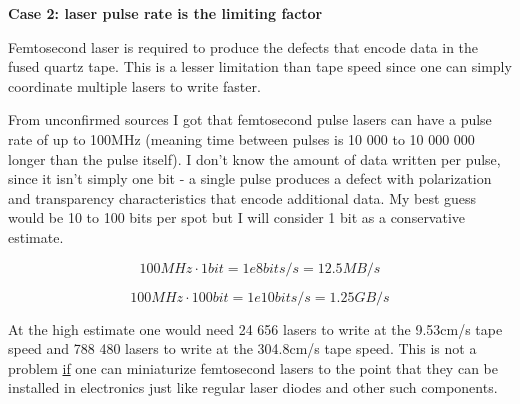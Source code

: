\documentclass[a4paper]{article}
\begin{document}
	\medskip
	
	\begin{center}
		\textbf{Case 2: laser pulse rate is the limiting factor}
	\end{center}
	
	\medskip
	
	Femtosecond laser is required to produce the defects that encode data in the fused quartz tape. This is a lesser limitation than tape speed since one can simply coordinate multiple lasers to write faster.
	
	\medskip
	
	From unconfirmed sources I got that femtosecond pulse lasers can have a pulse rate of up to 100MHz (meaning time between pulses is 10 000 to 10 000 000 longer than the pulse itself). I don't know the amount of data written per pulse, since it isn't simply one bit - a single pulse produces a defect with polarization and transparency characteristics that encode additional data. My best guess would be 10 to 100 bits per spot but I will consider 1 bit as a conservative estimate.
	
	\medskip
	
	$$ 100MHz \cdot 1bit = 1e8bits/s = 	12.5MB/s $$
	
	$$ 100MHz \cdot 100bit = 1e10bits/s = 1.25GB/s $$
	
	\medskip
	
	At the high estimate one would need 24 656 lasers to write at the 9.53cm/s tape speed and 788 480 lasers to write at the 304.8cm/s tape speed. This is not a problem \underline{if} one can miniaturize femtosecond lasers to the point that they can be installed in electronics just like regular laser diodes and other such components.
	
\end{document}
